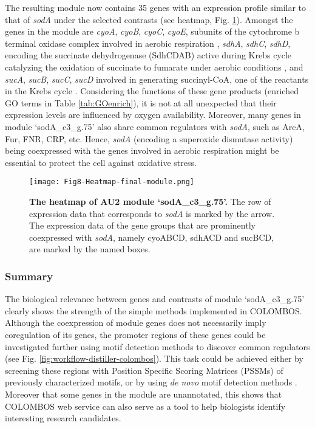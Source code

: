 The resulting module now contains 35 genes with an expression profile similar
to that of \textit{sodA} under the selected contrasts (see heatmap, Fig.
\ref{fig:colombos-heatmap-final}).  Amongst the genes in the module are
\textit{cyoA}, \textit{cyoB}, \textit{cyoC}, \textit{cyoE}, subunits of the
cytochrome b terminal oxidase complex involved in aerobic respiration
\cite{Cotter1992}, \textit{sdhA}, \textit{sdhC}, \textit{sdhD}, encoding the
succinate dehydrogenase (SdhCDAB) active during Krebs cycle catalyzing the
oxidation of succinate to fumarate under aerobic conditions \cite{Wilde1986},
and \textit{sucA}, \textit{sucB}, \textit{sucC}, \textit{sucD} involved in
generating succinyl-CoA, one of the reactants in the Krebs cycle
\cite{Buck1989}.  
%
Considering the functions of these gene products (enriched GO terms in Table
\ref{tab:GOenrich}), it is not at all unexpected that their expression levels
are influenced by oxygen availability.  Moreover, many genes in module
`sodA\_c3\_g.75' also share common regulators with \textit{sodA}, such as
ArcA, Fur, FNR, CRP, etc. Hence, \textit{sodA} (encoding a superoxide
dismutase activity) being coexpressed with the genes involved in aerobic
respiration might be essential to protect the cell against oxidative stress.

\begin{figure}[tb]
	\centering
  	\texttt{[image: Fig8-Heatmap-final-module.png]}
	\caption[COLOMBOS heatmap of module `sodA\_c3\_g.75']{
	\textbf{The heatmap of AU2 module `sodA\_c3\_g.75'.}
	The row of expression data that corresponds to \textit{sodA} is
	marked by the arrow. The expression data of the gene groups that are 
	prominently coexpressed with \textit{sodA}, namely cyoABCD, sdhACD and 
	sucBCD, are marked by the named boxes.}
	\label{fig:colombos-heatmap-final}
\end{figure}


\subsubsection{Summary}

The biological relevance between genes and contrasts of module
`sodA\_c3\_g.75' clearly shows the strength of the simple methods implemented
in COLOMBOS.
%
Although the coexpression of module genes does not necessarily imply
coregulation of its genes, 
%
the promoter regions of these genes could be investigated further using motif
detection methods to discover common regulators (see
Fig. \ref{fig:workflow-distiller-colombos}).
%
This task could be achieved either by screening these regions with Position
Specific Scoring Matrices (PSSMs) of previously characterized motifs, or by
using \textit{de novo} motif detection methods \cite{Tompa2005, Storms2010}.
%
Moreover that some genes in the module are unannotated, this shows that
COLOMBOS web service can also serve as a tool to help biologists identify
interesting research candidates.




